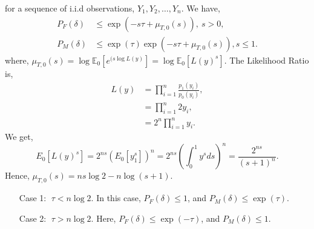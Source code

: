 \documentclass[a4paper,english,12pt]{article}
\begin{document}
for a sequence of i.i.d observations, $Y_1,Y_2,\dots,Y_n$. We have,
\begin{align*}
P_F(\delta)&\leq\exp(-s\tau+\mu_{T,0}(s)),~s>0,\\
P_M(\delta)&\leq\exp(\tau)\exp(-s\tau+\mu_{T,0}(s)), s\leq 1.
\end{align*} 
where, $\mu_{T,0}(s)=\log \mathbb{E}_0[e^{(s\log L(y)}]=\log \mathbb{E}_0[L(y)^{s}]$. The Likelihood Ratio is,
\begin{align*}
L(y)&=\prod_{i=1}^{n}\frac{p_1(y_{i})}{p_0(y_{i})},\\
&=\prod_{i=1}^{n} 2y_{i},\\
&=2^{n}\prod_{i=1}^{n} y_{i}.
\end{align*}
We get,
\begin{equation*}
E_0[L(y)^{s}] = 2^{ns} (E_{0}[y_{1}^{s}])^{n}= 2^{ns}(\int_{0}^{1}y^{s}ds)^{n}= \frac{2^{ns}}{(s + 1)^n}.
\end{equation*}
Hence, $\mu_{T,0}(s) = ns\log2 - n\log(s + 1)$.
\begin{enumerate}
\item[Case 1:] $\;\tau<n\log2 $.
In this case, $P_F(\delta)\leq 1 $, and $P_M(\delta)\leq \exp(\tau) $.
\item[Case 2:] $\;\tau>n\log2  $.
Here, $P_F(\delta)\leq \exp(-\tau)$, and $P_M(\delta)\leq 1 $.
\end{enumerate}
\end{document}

